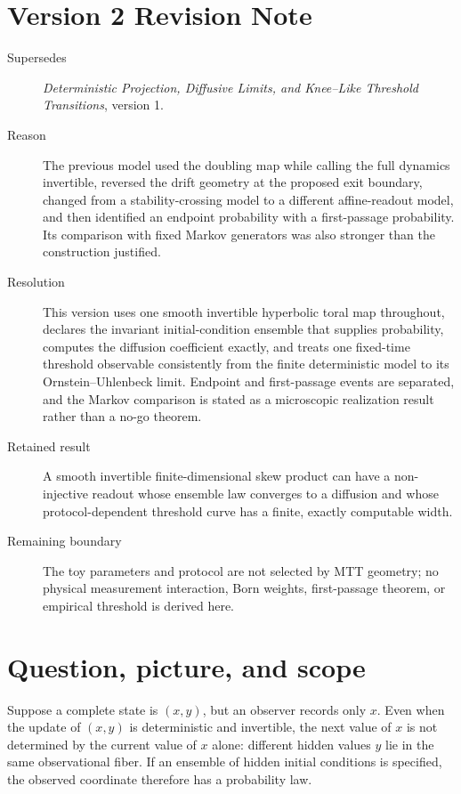 \documentclass[11pt]{article}
\begin{document}
\section*{Version 2 Revision Note}
\begin{description}
\item[Supersedes] \emph{Deterministic Projection, Diffusive Limits, and
Knee--Like Threshold Transitions}, version 1.
\item[Reason] The previous model used the doubling map while calling the full
dynamics invertible, reversed the drift geometry at the proposed exit
boundary, changed from a stability-crossing model to a different affine-readout
model, and then identified an endpoint probability with a first-passage
probability. Its comparison with fixed Markov generators was also stronger than
the construction justified.
\item[Resolution] This version uses one smooth invertible hyperbolic toral map
throughout, declares the invariant initial-condition ensemble that supplies
probability, computes the diffusion coefficient exactly, and treats one
fixed-time threshold observable consistently from the finite deterministic
model to its Ornstein--Uhlenbeck limit. Endpoint and first-passage events are
separated, and the Markov comparison is stated as a microscopic realization
result rather than a no-go theorem.
\item[Retained result] A smooth invertible finite-dimensional skew product can
have a non-injective readout whose ensemble law converges to a diffusion and
whose protocol-dependent threshold curve has a finite, exactly computable
width.
\item[Remaining boundary] The toy parameters and protocol are not selected by
MTT geometry; no physical measurement interaction, Born weights, first-passage
theorem, or empirical threshold is derived here.
\end{description}

\tableofcontents

\section{Question, picture, and scope}

Suppose a complete state is \((x,y)\), but an observer records only \(x\). Even when the update of \((x,y)\) is deterministic and invertible, the next value of \(x\) is not determined by the current value of \(x\) alone: different hidden values \(y\) lie in the same observational fiber. If an ensemble of hidden initial conditions is specified, the observed coordinate therefore has a probability law.
\end{document}
